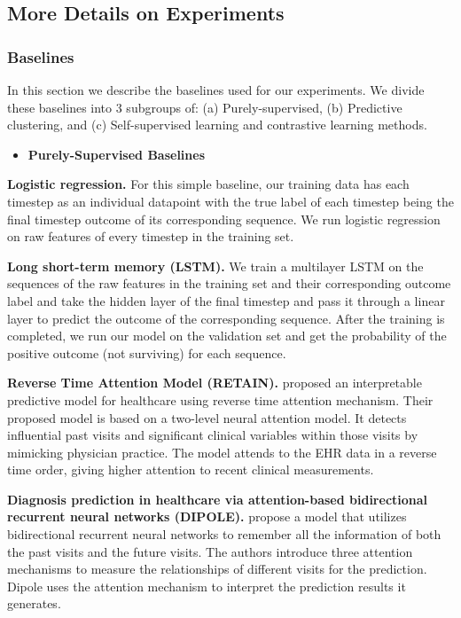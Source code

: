 \subsection{More Details on Experiments}
\label{ch02:sec:experiment-details}

\ChTwoHeadingOnly
\subsubsection{Baselines}
\label{ch02:sec:baselines}
In this section we describe the baselines used for our experiments.
We divide these baselines into 3 subgroups of: (a) Purely-supervised, (b) Predictive clustering, and (c) Self-supervised learning and contrastive learning methods.

\begin{itemize}
    \item \textbf{Purely-Supervised Baselines}
    
\end{itemize}
\noindent
\textbf{Logistic regression.}
For this simple baseline, our training data has each timestep as an individual datapoint with the true label of each timestep being the final timestep outcome of its corresponding sequence. 
We run logistic regression on raw features of every timestep in the training set.


\noindent
\textbf{Long short-term memory (LSTM).}
We train a multilayer LSTM \citep{hochreiter1997long} on the sequences of the raw features in the training set and their corresponding outcome label and take the hidden layer of the final timestep and pass it through a linear layer to predict the outcome of the corresponding sequence.
After the training is completed, we run our model on the validation set and get the probability of the positive outcome (not surviving) for each sequence.


\noindent
\textbf{Reverse Time Attention Model (RETAIN).}
\citet{choi2016retain} proposed an interpretable predictive model for healthcare using reverse time attention mechanism. Their proposed model is based on a two-level neural attention model. It detects influential past visits and significant clinical variables within those visits by mimicking physician practice. The model attends to the EHR data in a reverse time order, giving higher attention to recent clinical measurements.


\noindent
\textbf{Diagnosis prediction in healthcare via attention-based bidirectional recurrent neural networks (DIPOLE).}
\citet{ma2017dipole} propose a model that utilizes bidirectional recurrent neural networks to remember all the information of both the past visits and the future visits. The authors introduce three attention mechanisms to measure the relationships of different visits for the prediction. Dipole uses the attention mechanism to interpret the prediction results it generates.


